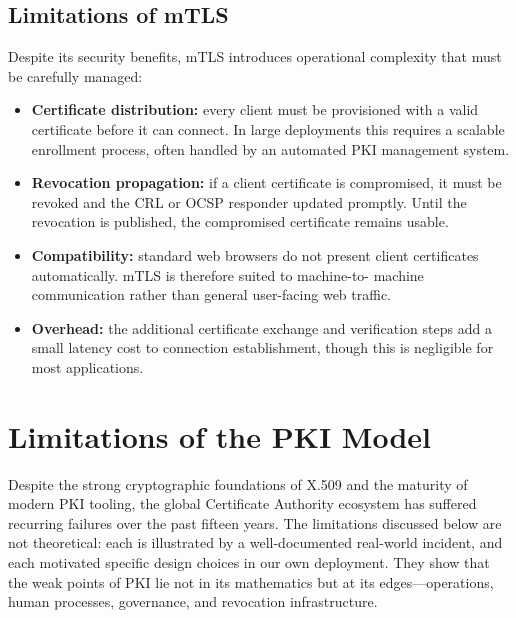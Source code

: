 \documentclass[10pt,twocolumn]{article}
\begin{document}
\subsection{Limitations of mTLS}

Despite its security benefits, mTLS introduces operational complexity that
must be carefully managed:

\begin{itemize}
  \item \textbf{Certificate distribution:} every client must be provisioned
        with a valid certificate before it can connect. In large deployments
        this requires a scalable enrollment process, often handled by an
        automated PKI management system.
  \item \textbf{Revocation propagation:} if a client certificate is
        compromised, it must be revoked and the CRL or OCSP responder
        updated promptly. Until the revocation is published, the compromised
        certificate remains usable.
  \item \textbf{Compatibility:} standard web browsers do not present client
        certificates automatically. mTLS is therefore suited to machine-to-
        machine communication rather than general user-facing web traffic.
  \item \textbf{Overhead:} the additional certificate exchange and verification
        steps add a small latency cost to connection establishment, though
        this is negligible for most applications.
\end{itemize}

\section{Limitations of the PKI Model}

Despite the strong cryptographic foundations of X.509 and the maturity of
modern PKI tooling, the global Certificate Authority ecosystem has suffered
recurring failures over the past fifteen years. The limitations discussed
below are not theoretical: each is illustrated by a well-documented
real-world incident, and each motivated specific design choices in our
own deployment. They show that the weak points of PKI lie not in its
mathematics but at its edges---operations, human processes, governance,
and revocation infrastructure.
\end{document}
